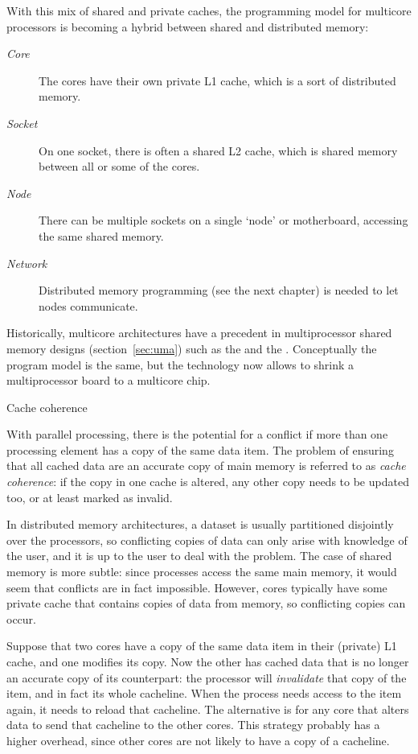 With
this mix of shared and private caches, the programming model for
multicore processors is becoming a hybrid between shared and
distributed memory:
\begin{description}
\item[{\it Core}] The cores have their own private L1 cache, which is a sort of
  distributed memory. 
\item[{\it Socket}] On one socket, there is often a shared L2 cache, which is shared
  memory between all or some of the cores.
\item[{\it Node}] There can be multiple sockets on a single `node' or
  motherboard, accessing the same shared memory.
\item[{\it Network}] Distributed memory programming
    (see the next chapter)
  is needed to let nodes
  communicate.
\end{description}

  Historically, multicore architectures have a precedent in
  multiprocessor shared memory designs (section~\ref{sec:uma}) such as
  the  and the . Conceptually the program model is the same, but the
  technology now allows to shrink a multiprocessor board to a multicore
  chip.

 {Cache coherence}
\label{sec:coherence}

With parallel processing, there is the potential for a conflict if more
than one processing element has a copy of the same data item. The problem of
ensuring that all cached data are an accurate copy of main memory is
referred to as \emph{cache coherence}:
if the copy in one cache is altered, 
any other copy needs to be updated too, or at least marked as invalid.

In distributed memory architectures, a dataset is usually partitioned
disjointly over the processors,
so conflicting copies of data can only
arise with knowledge of the user, and it is up to the user to
deal with the problem. The case of shared memory is more subtle: since
processes access the same main memory, it would seem that conflicts
are in fact impossible.
However, cores typically have some private
cache that contains copies of data from memory, so conflicting
copies can occur.

Suppose that two cores have a copy of the same data item in their
(private) L1 cache, and one modifies its copy. Now the other has
cached data that is no longer an accurate copy of its counterpart: the
processor will \emph{invalidate} that
copy of the item, and in fact its whole cacheline. When the process
needs access to the item again, it needs to reload that cacheline.
  The alternative is for any core that alters data to send that
  cacheline to the other cores.
  This strategy probably has a higher overhead,
  since other cores are not likely to have a copy of a cacheline.

